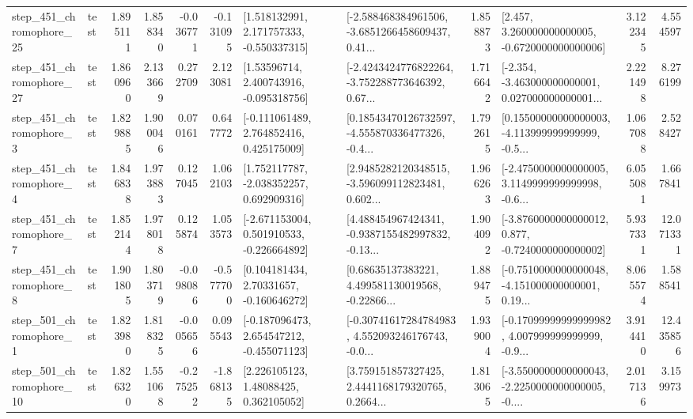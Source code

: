 \begin{tabular}{llrrrrllrlrr}
  step\_451\_chromophore\_25 &      test &      1.895111 &    1.858340 &     -0.036771 & -0.131095 &    [1.518132991, 2.171757333, -0.550337315] &  [-2.588468384961506, -3.6851266458609437, 0.41... &       1.858873 &    [2.457, 3.260000000000005, -0.6720000000000006] &            3.122345 &          4.554597 \\
  step\_451\_chromophore\_27 &      test &      1.860960 &    2.133669 &      0.272709 &  2.123081 &     [1.53596714, 2.400743916, -0.095318756] &  [-2.4243424776822264, -3.752288773646392, 0.67... &       1.716642 &  [-2.354, -3.463000000000001, 0.027000000000001... &            2.221498 &          8.276199 \\
   step\_451\_chromophore\_3 &      test &      1.829885 &    1.900046 &      0.070161 &  0.647772 &    [-0.111061489, 2.764852416, 0.425175009] &  [0.18543470126732597, -4.555870336477326, -0.4... &       1.792615 &  [0.15500000000000003, -4.113999999999999, -0.5... &            1.067088 &          2.528427 \\
   step\_451\_chromophore\_4 &      test &      1.846838 &    1.973883 &      0.127045 &  1.062103 &    [1.752117787, -2.038352257, 0.692909316] &  [2.9485282120348515, -3.596099112823481, 0.602... &       1.966263 &  [-2.4750000000000005, 3.1149999999999998, -0.6... &            6.055081 &          1.667841 \\
   step\_451\_chromophore\_7 &      test &      1.852144 &    1.978018 &      0.125874 &  1.053573 &   [-2.671153004, 0.501910533, -0.226664892] &  [4.488454967424341, -0.9387155482997832, -0.13... &       1.904092 &  [-3.8760000000000012, 0.877, -0.7240000000000002] &            5.937331 &         12.071331 \\
   step\_451\_chromophore\_8 &      test &      1.901805 &    1.803719 &     -0.098086 & -0.577700 &     [0.104181434, 2.70331657, -0.160646272] &  [0.68635137383221, 4.499581130019568, -0.22866... &       1.889475 &  [-0.7510000000000048, -4.151000000000001, 0.19... &            8.065574 &          1.588541 \\
   step\_501\_chromophore\_1 &      test &      1.823980 &    1.818325 &     -0.005656 &  0.095543 &   [-0.187096473, 2.654547212, -0.455071123] &  [-0.30741617284784983, 4.552093246176743, -0.0... &       1.939004 &  [-0.17099999999999982, 4.007999999999999, -0.9... &            3.914410 &         12.435856 \\
  step\_501\_chromophore\_10 &      test &      1.826320 &    1.551068 &     -0.275252 & -1.868135 &      [2.226105123, 1.48088425, 0.362105052] &  [3.759151857327425, 2.4441168179320765, 0.2664... &       1.813065 &  [-3.5500000000000043, -2.2250000000000005, -0.... &            2.017136 &          3.159973 \\

\end{tabular}
